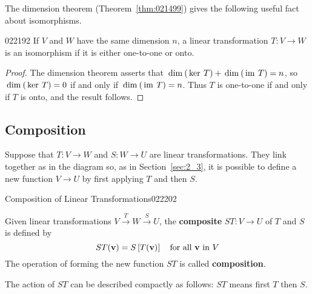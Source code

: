 The dimension theorem (Theorem~\ref{thm:021499}) gives the following useful fact about isomorphisms.


\begin{theorem}{}{022192}
If $V$ and $W$ have the same dimension $n$, a linear transformation $T : V \to W$ is an isomorphism if it is either one-to-one or onto.
\end{theorem}

\begin{proof}
The dimension theorem asserts that $\thinspace\operatorname{dim\medspace}(\thinspace\operatorname{ker \medspace}T) + \thinspace\operatorname{dim\medspace}(\thinspace\operatorname{im \medspace}T) = n$, so $\thinspace\operatorname{dim\medspace}(\thinspace\operatorname{ker \medspace}T) = 0$ if and only if $\thinspace\operatorname{dim\medspace}(\thinspace\operatorname{im \medspace}T) = n$. Thus $T$ is one-to-one if and only if $T$ is onto, and the result follows.
\end{proof}

\subsection*{Composition}


Suppose that $T : V \to W$ and $S : W \to U$ are linear transformations. They link together as in the diagram so, as in Section~\ref{sec:2_3}, it is possible to define a new function $V \to U$ by first applying $T$ and then $S$.


\begin{definition}{Composition of Linear Transformations}{022202}
\begin{wrapfigure}{l}{4.5cm}
	\centering
		
\end{wrapfigure}
	
\setlength{\rightskip}{0pt plus 200pt}
Given linear transformations $V \xrightarrow{T} W \xrightarrow{S} U$, the \textbf{composite} $ST : V \to U$ of $T$ and $S$ is defined by
\begin{equation*}
ST(\textbf{v}) = S\left[T(\textbf{v})\right] \quad \mbox{for all } \textbf{v} \mbox{ in } V
\end{equation*}
The operation of forming the new function $ST$ is called \textbf{composition}.\footnotemark
\end{definition}

\noindent The action of $ST$ can be described compactly as follows: $ST$ means first $T$ then $S$.


